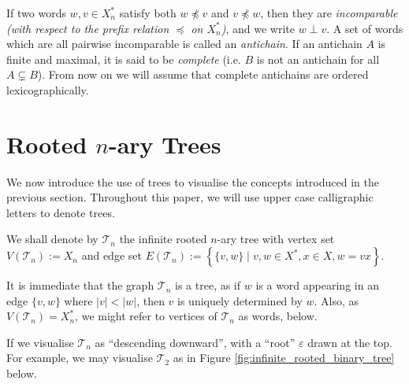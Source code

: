 \documentclass[12pt]{amsart}
\newcommand{\T}{\mathcal{T}}
\newcommand{\tn}{\T_n}
\newcommand{\xn}{X_n}
\newcommand{\xns}{X_n^*}
\begin{document}
        If two words $ w , v  \in \xns$ satisfy both $ w  \npreceq  v $ and $ v  \npreceq  w $, then they are \textit{incomparable (with respect to the prefix relation $\preceq$ on $\xns$)}, and we write $ w  \perp  v $. A set of words which are all pairwise incomparable is called an \textit{antichain}. If an antichain $A$ is finite and maximal, it is said to be \textit{complete} (i.e. $B$ is not an antichain for all $A \subsetneq B$). From now on we will assume that complete antichains are ordered lexicographically.

  \section{Rooted $n$-ary Trees}
        
        We now introduce the use of trees to visualise the concepts introduced in the previous section. Throughout this paper, we will use upper case calligraphic letters to denote trees.
        
        \begin{definition}[The tree $\tn$]\label{def:tn}
        We shall denote by $\tn$ the infinite rooted $n$-ary tree with vertex set $V(\tn):=\xn$ and edge set $E(\tn):=\left\{\{v,w\}\mid v, w\in X^*,x\in X, w=vx\right\}$.
        \end{definition}

It is immediate that the graph $\tn$ is a tree, as if $w$ is a word appearing in an edge $\{v,w\}$ where $|v|<|w|$, then $v$ is uniquely determined by $w$.  Also, as $V(\tn)=\xns$, we might refer to vertices of $\tn$ as words, below.
        
        If we visualise $\tn$ as ``descending downward'', with a ``root'' $\varepsilon$ drawn at the top.  For example, we may visualise $\T_2$ as in Figure \ref{fig:infinite_rooted_binary_tree} below.
        
\end{document}
